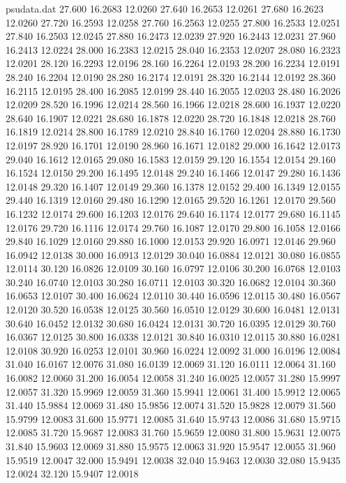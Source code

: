 \begin{filecontents*}{psudata.dat}
27.600 16.2683 12.0260
27.640 16.2653 12.0261
27.680 16.2623 12.0260
27.720 16.2593 12.0258
27.760 16.2563 12.0255
27.800 16.2533 12.0251
27.840 16.2503 12.0245
27.880 16.2473 12.0239
27.920 16.2443 12.0231
27.960 16.2413 12.0224
28.000 16.2383 12.0215
28.040 16.2353 12.0207
28.080 16.2323 12.0201
28.120 16.2293 12.0196
28.160 16.2264 12.0193
28.200 16.2234 12.0191
28.240 16.2204 12.0190
28.280 16.2174 12.0191
28.320 16.2144 12.0192
28.360 16.2115 12.0195
28.400 16.2085 12.0199
28.440 16.2055 12.0203
28.480 16.2026 12.0209
28.520 16.1996 12.0214
28.560 16.1966 12.0218
28.600 16.1937 12.0220
28.640 16.1907 12.0221
28.680 16.1878 12.0220
28.720 16.1848 12.0218
28.760 16.1819 12.0214
28.800 16.1789 12.0210
28.840 16.1760 12.0204
28.880 16.1730 12.0197
28.920 16.1701 12.0190
28.960 16.1671 12.0182
29.000 16.1642 12.0173
29.040 16.1612 12.0165
29.080 16.1583 12.0159
29.120 16.1554 12.0154
29.160 16.1524 12.0150
29.200 16.1495 12.0148
29.240 16.1466 12.0147
29.280 16.1436 12.0148
29.320 16.1407 12.0149
29.360 16.1378 12.0152
29.400 16.1349 12.0155
29.440 16.1319 12.0160
29.480 16.1290 12.0165
29.520 16.1261 12.0170
29.560 16.1232 12.0174
29.600 16.1203 12.0176
29.640 16.1174 12.0177
29.680 16.1145 12.0176
29.720 16.1116 12.0174
29.760 16.1087 12.0170
29.800 16.1058 12.0166
29.840 16.1029 12.0160
29.880 16.1000 12.0153
29.920 16.0971 12.0146
29.960 16.0942 12.0138
30.000 16.0913 12.0129
30.040 16.0884 12.0121
30.080 16.0855 12.0114
30.120 16.0826 12.0109
30.160 16.0797 12.0106
30.200 16.0768 12.0103
30.240 16.0740 12.0103
30.280 16.0711 12.0103
30.320 16.0682 12.0104
30.360 16.0653 12.0107
30.400 16.0624 12.0110
30.440 16.0596 12.0115
30.480 16.0567 12.0120
30.520 16.0538 12.0125
30.560 16.0510 12.0129
30.600 16.0481 12.0131
30.640 16.0452 12.0132
30.680 16.0424 12.0131
30.720 16.0395 12.0129
30.760 16.0367 12.0125
30.800 16.0338 12.0121
30.840 16.0310 12.0115
30.880 16.0281 12.0108
30.920 16.0253 12.0101
30.960 16.0224 12.0092
31.000 16.0196 12.0084
31.040 16.0167 12.0076
31.080 16.0139 12.0069
31.120 16.0111 12.0064
31.160 16.0082 12.0060
31.200 16.0054 12.0058
31.240 16.0025 12.0057
31.280 15.9997 12.0057
31.320 15.9969 12.0059
31.360 15.9941 12.0061
31.400 15.9912 12.0065
31.440 15.9884 12.0069
31.480 15.9856 12.0074
31.520 15.9828 12.0079
31.560 15.9799 12.0083
31.600 15.9771 12.0085
31.640 15.9743 12.0086
31.680 15.9715 12.0085
31.720 15.9687 12.0083
31.760 15.9659 12.0080
31.800 15.9631 12.0075
31.840 15.9603 12.0069
31.880 15.9575 12.0063
31.920 15.9547 12.0055
31.960 15.9519 12.0047
32.000 15.9491 12.0038
32.040 15.9463 12.0030
32.080 15.9435 12.0024
32.120 15.9407 12.0018

\end{filecontents*}
